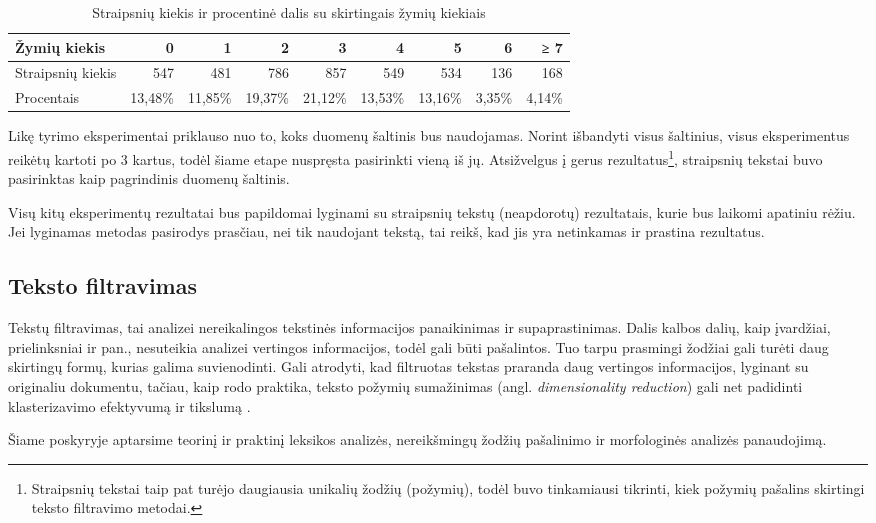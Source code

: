 \documentclass{VUMIFInfBakalaurinis}
\begin{document}
\begin{table}[H]
  \centering
  \caption{Straipsnių kiekis ir procentinė dalis su skirtingais žymių kiekiais}
  \begin{tabular}{|l|r|r|r|r|r|r|r|r|}
  \hline
  Žymių kiekis & 0       & 1       & 2       & 3       & 4       & 5       & 6      & ≥ 7    \\ \hline
  Straipsnių kiekis   & 547     & 481     & 786     & 857     & 549     & 534     & 136    & 168    \\ \hline
  Procentais   & 13,48\% & 11,85\% & 19,37\% & 21,12\% & 13,53\% & 13,16\% & 3,35\% & 4,14\% \\ \hline
  \end{tabular}
  \end{table}

Likę tyrimo eksperimentai priklauso nuo to, koks duomenų šaltinis bus
naudojamas. Norint išbandyti visus šaltinius, visus eksperimentus
reikėtų kartoti po 3 kartus, todėl šiame etape nuspręsta pasirinkti
vieną iš jų. Atsižvelgus į gerus rezultatus\footnote{Straipsnių tekstai
  taip pat turėjo daugiausia unikalių žodžių (požymių), todėl buvo
  tinkamiausi tikrinti, kiek požymių pašalins skirtingi teksto filtravimo metodai.},
straipsnių tekstai buvo pasirinktas kaip pagrindinis duomenų šaltinis.

Visų kitų eksperimentų rezultatai bus papildomai lyginami su straipsnių
tekstų (neapdorotų) rezultatais, kurie bus laikomi apatiniu rėžiu. Jei
lyginamas metodas pasirodys prasčiau, nei tik naudojant tekstą, tai
reikš, kad jis yra netinkamas ir prastina rezultatus.

\subsection{Teksto filtravimas}

Tekstų filtravimas, tai analizei nereikalingos tekstinės informacijos
panaikinimas ir supaprastinimas. Dalis kalbos dalių, kaip
įvardžiai, prielinksniai ir pan., nesuteikia analizei vertingos
informacijos, todėl gali būti pašalintos. Tuo tarpu prasmingi žodžiai
gali turėti daug skirtingų formų, kurias galima suvienodinti. Gali
atrodyti, kad filtruotas tekstas praranda daug vertingos informacijos,
lyginant su originaliu dokumentu, tačiau, kaip rodo praktika, teksto
požymių sumažinimas (angl. \emph{dimensionality reduction}) gali net
padidinti klasterizavimo efektyvumą ir tikslumą \cite{mugunthadevi2011survey}.

Šiame poskyryje aptarsime teorinį ir praktinį leksikos analizės,
nereikšmingų žodžių pašalinimo ir morfologinės analizės panaudojimą.
\end{document}
